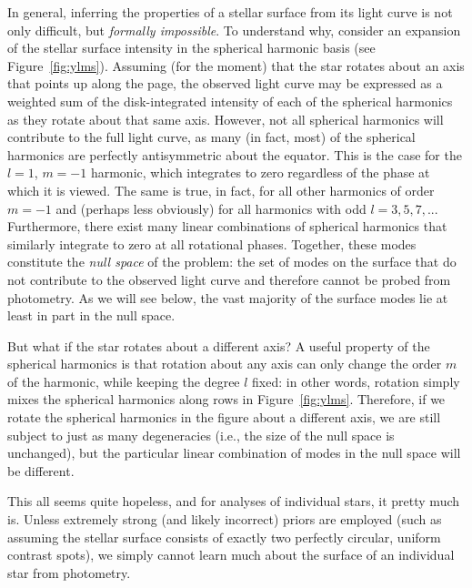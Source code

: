 \documentclass[modern]{aastex62}
\begin{document}
In general, inferring the properties of a stellar surface from its light curve is not
only difficult, but \emph{formally impossible}. To understand why, consider
an expansion of the stellar surface intensity in the spherical
harmonic basis (see Figure~\ref{fig:ylms}). Assuming (for the moment) that the
star rotates about an axis that points up along the page, the observed
light curve may be expressed as a weighted sum of the disk-integrated intensity
of each of the spherical harmonics as they rotate about that same axis.
However, not all spherical harmonics will contribute to the full light curve,
as many (in fact, most) of the spherical harmonics are perfectly antisymmetric
about the equator. This is the case for
the $l = 1$, $m = -1$ harmonic, which integrates to zero regardless of
the phase at which it is viewed. The same is true, in fact, for all other harmonics
of order $m = -1$ and (perhaps less obviously) for all harmonics with odd
$l = 3, 5, 7, ...$ Furthermore, there exist many linear combinations of
spherical harmonics that similarly integrate to zero at all rotational
phases. Together, these modes constitute the \emph{null space} of the problem:
the set of modes on the surface that do not contribute to the observed
light curve and therefore cannot be probed from photometry.
As we will see below, the vast majority of the surface modes lie at least in part in the null
space.

But what if the star rotates about a different axis? A useful property of
the spherical harmonics is that rotation about any axis can only change the
order $m$ of the harmonic, while keeping the degree $l$ fixed: in other
words, rotation simply mixes the spherical harmonics along rows in
Figure~\ref{fig:ylms}. Therefore, if we rotate the spherical harmonics
in the figure about a different axis, we are still subject to just as
many degeneracies (i.e., the size of the null space is unchanged),
but the particular linear combination of modes in the null space will
be different.

This all seems quite hopeless, and for analyses of individual stars,
it pretty much is. Unless extremely strong (and likely incorrect) priors are employed
(such as assuming the stellar surface consists of exactly two perfectly
circular, uniform contrast spots), we simply cannot learn much about
the surface of an individual star from photometry.
\end{document}
